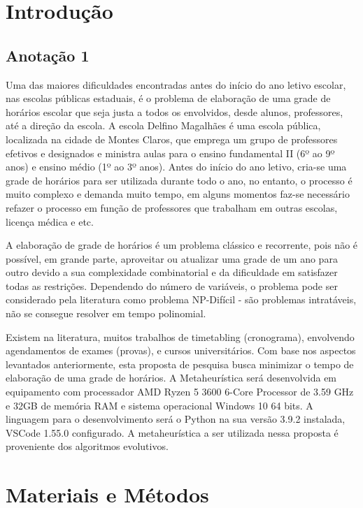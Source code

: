 \documentclass[12pt, a4paper, fleqn, titlepage, onecolumn, abntex2]{article}
\begin{document}
\section{Introdução}

\subsection{Anotação 1}
Uma das maiores dificuldades encontradas antes do início do ano letivo escolar, nas escolas públicas estaduais, é o problema de elaboração de uma grade de horários escolar que seja justa a todos os envolvidos, desde alunos, professores, até a direção da escola. A escola Delfino Magalhães é uma escola pública, localizada na cidade de Montes Claros, que emprega um grupo de professores efetivos e designados e ministra aulas para o ensino fundamental II (6º ao 9º anos) e ensino médio (1º ao 3º anos). Antes do início do ano letivo, cria-se uma grade de horários para ser utilizada durante todo o ano, no entanto, o processo é muito complexo e demanda muito tempo, em alguns momentos faz-se necessário refazer o processo em função de professores que trabalham em outras escolas, licença médica e etc.

A elaboração de grade de horários é um problema clássico e recorrente, pois não é possível, em grande parte, aproveitar ou atualizar uma grade de um ano para outro devido a sua complexidade combinatorial e da dificuldade em satisfazer todas as restrições. Dependendo do número de variáveis, o problema pode ser considerado pela literatura como problema NP-Difícil - são problemas intratáveis, não se consegue resolver em tempo polinomial.

Existem na literatura, muitos trabalhos de timetabling (cronograma), envolvendo agendamentos de exames (provas), e cursos universitários. Com base nos aspectos levantados anteriormente, esta proposta de pesquisa busca minimizar o tempo de elaboração de uma grade de horários. A Metaheurística será desenvolvida em equipamento com processador AMD Ryzen 5 3600 6-Core Processor de 3.59 GHz e 32GB de memória RAM e sistema operacional Windows 10 64 bits. A linguagem para o desenvolvimento será o Python na sua versão 3.9.2 instalada, VSCode 1.55.0 configurado. A metaheurística a ser utilizada nessa proposta é proveniente dos algoritmos evolutivos.

\section{Materiais e Métodos}
\end{document}
